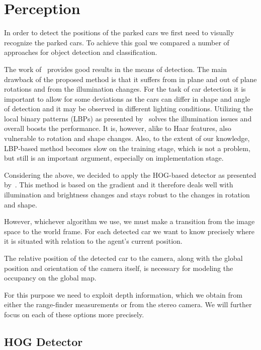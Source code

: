 
\section{Perception} %
\label{sec:perception}
    In order to detect the positions of the parked cars we first need to visually recognize the parked cars. To achieve this goal we compared a number of approaches for object detection and classification.

    The work of~\cite{violajones2001} provides good results in the means of
    detection. The main drawback of the proposed method is that it suffers
    from in plane and out of plane rotations and from the illumination
    changes. For the task of car detection it is important to allow for some
    deviations as the cars can differ in shape and angle of detection and it
    may be observed in different lighting conditions. Utilizing the local
    binary patterns (LBPs) as presented by~\cite{lbp2010} solves the
    illumination issues and overall boosts the performance. It is, however,
    alike to Haar features, also vulnerable to rotation and shape changes.
    Also, to the extent of our knowledge, LBP-based method becomes slow on the
    training stage, which is not a problem, but still is an important
    argument, especially on implementation stage.

    Considering the above, we decided to apply the HOG-based detector as
    presented by~\cite{dalal2005}. This method is based on the gradient and it
    therefore deals well with illumination and brightness changes and stays
    robust to the changes in rotation and shape.

    However, whichever algorithm we use, we must make a transition from the
    image space to the world frame. For each detected car we want to know
    precisely where it is situated with relation to the agent's current
    position.

    The relative position of the detected car to the camera, along with the
    global position and orientation of the camera itself, is necessary for
    modeling the occupancy on the global map.

    For this purpose we need to exploit depth information, which we obtain
    from either the range-finder measurements or from the stereo camera.
    We will further focus on each of these options more precisely.

    \subsection{HOG Detector}\label{sub:hog_detector}

